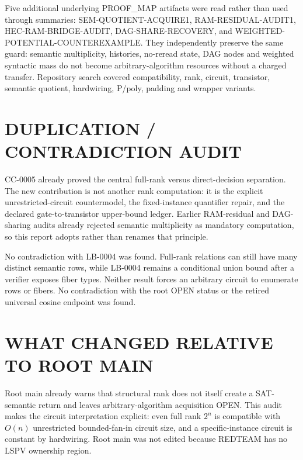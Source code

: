\documentclass[11pt]{article}
\begin{document}
Five additional underlying PROOF\_MAP artifacts were read rather than used
through summaries: SEM-QUOTIENT-ACQUIRE1, RAM-RESIDUAL-AUDIT1,
HEC-RAM-BRIDGE-AUDIT, DAG-SHARE-RECOVERY, and
WEIGHTED-POTENTIAL-COUNTEREXAMPLE.  They independently preserve the same
guard: semantic multiplicity, histories, no-reread state, DAG nodes and
weighted syntactic mass do not become arbitrary-algorithm resources without
a charged transfer.  Repository search covered compatibility, rank,
circuit, transistor, semantic quotient, hardwiring, P/poly, padding and
wrapper variants.

\section{DUPLICATION / CONTRADICTION AUDIT}
CC-0005 already proved the central full-rank versus direct-decision
separation.  The new contribution is not another rank computation: it is the
explicit unrestricted-circuit countermodel, the fixed-instance quantifier
repair, and the declared gate-to-transistor upper-bound ledger.  Earlier
RAM-residual and DAG-sharing audits already rejected semantic multiplicity
as mandatory computation, so this report adopts rather than renames that
principle.

No contradiction with LB-0004 was found.  Full-rank relations can still
have many distinct semantic rows, while LB-0004 remains a conditional union
bound after a verifier exposes fiber types.  Neither result forces an
arbitrary circuit to enumerate rows or fibers.  No contradiction with the
root OPEN status or the retired universal cosine endpoint was found.

\section{WHAT CHANGED RELATIVE TO ROOT MAIN}
Root main already warns that structural rank does not itself create a
SAT-semantic return and leaves arbitrary-algorithm acquisition OPEN.  This
audit makes the circuit interpretation explicit: even full rank $2^n$ is
compatible with $O(n)$ unrestricted bounded-fan-in circuit size, and a
specific-instance circuit is constant by hardwiring.  Root main was not
edited because REDTEAM has no LSPV ownership region.
\end{document}
